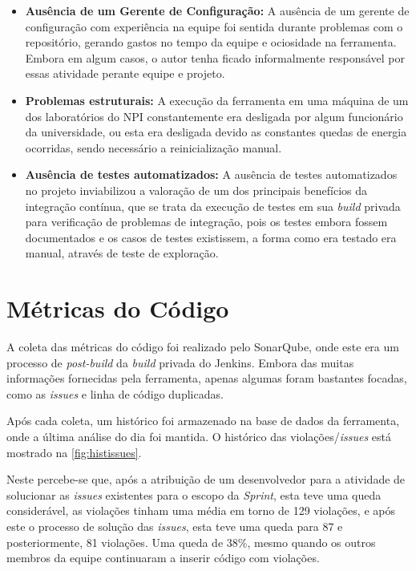 \begin{itemize}
\item \textbf{Ausência de um Gerente de Configuração:}
A ausência de um gerente de configuração com experiência na equipe foi sentida durante problemas com o repositório, gerando gastos no tempo da equipe e ociosidade na ferramenta. Embora em algum casos, o autor tenha ficado informalmente responsável por essas atividade perante equipe e projeto.

\item \textbf{Problemas estruturais:}
A execução da ferramenta em uma máquina de um dos laboratórios do NPI constantemente era desligada por algum funcionário da universidade, ou esta era desligada devido as constantes quedas de energia ocorridas, sendo necessário a reinicialização manual.

\item \textbf{Ausência de testes automatizados:}
A ausência de testes automatizados no projeto inviabilizou a valoração de um dos principais benefícios da integração contínua, que se trata da execução de testes em sua \textit{build} privada para verificação de problemas de integração, pois os testes embora fossem documentados e os casos de testes existissem, a forma como era testado era manual, através de teste de exploração.
\end{itemize}

\section{Métricas do Código}
A coleta das métricas do código foi realizado pelo SonarQube, onde este era um processo de \textit{post-build} da \textit{build} privada do Jenkins. Embora das muitas informações fornecidas pela ferramenta, apenas algumas foram bastantes focadas, como as \textit{issues} e linha de código duplicadas.

Após cada coleta, um histórico foi armazenado na base de dados da ferramenta, onde a última análise do dia foi mantida. O histórico das violações/\textit{issues} está mostrado na \autoref{fig:histissues}.

Neste percebe-se que, após a atribuição de um desenvolvedor para a atividade de solucionar as \textit{issues} existentes para o escopo da \textit{Sprint}, esta teve uma queda considerável, as violações tinham uma média em torno de 129 violações, e após este o processo de solução das \textit{issues}, esta teve uma queda para 87 e posteriormente, 81 violações. Uma queda de 38\%,  mesmo quando os outros membros da equipe continuaram a inserir código com violações.

